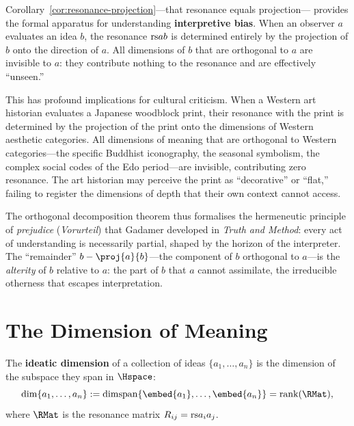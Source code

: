 \begin{interpretation}
\label{interp:ch12:projection_bias}
Corollary~\ref{cor:resonance-projection}---that resonance equals projection---
provides the formal apparatus for understanding \textbf{interpretive bias}.
When an observer $a$ evaluates an idea $b$, the resonance $\mathrm{rs}{a}{b}$ is
determined entirely by the projection of $b$ onto the direction of $a$.  All
dimensions of $b$ that are orthogonal to $a$ are invisible to $a$: they
contribute nothing to the resonance and are effectively ``unseen.''

This has profound implications for cultural criticism.  When a Western art
historian evaluates a Japanese woodblock print, their resonance with the
print is determined by the projection of the print onto the dimensions of
Western aesthetic categories.  All dimensions of meaning that are orthogonal
to Western categories---the specific Buddhist iconography, the seasonal
symbolism, the complex social codes of the Edo period---are invisible,
contributing zero resonance.  The art historian may perceive the print as
``decorative'' or ``flat,'' failing to register the dimensions of depth that
their own context cannot access.

The orthogonal decomposition theorem thus formalises the hermeneutic
principle of \emph{prejudice} (\emph{Vorurteil}) that Gadamer developed in
\emph{Truth and Method}: every act of understanding is necessarily partial,
shaped by the horizon of the interpreter.  The ``remainder''
$b - \proj{a}{b}$---the component of $b$ orthogonal to $a$---is the
\emph{alterity} of $b$ relative to $a$: the part of $b$ that $a$ cannot
assimilate, the irreducible otherness that escapes interpretation.
\end{interpretation}



\section{The Dimension of Meaning}

\begin{definition}
\label{def:dimension}
The \textbf{ideatic dimension} of a collection of ideas
$\{a_1, \ldots, a_n\}$ is the dimension of the subspace they span in
$\Hspace$:
\[
  \dim\{a_1, \ldots, a_n\}
  := \dim\!\operatorname{span}\{\embed{a_1}, \ldots, \embed{a_n}\}
  = \operatorname{rank}(\RMat),
\]
where $\RMat$ is the resonance matrix $R_{ij} = \mathrm{rs}{a_i}{a_j}$.
\end{definition}


